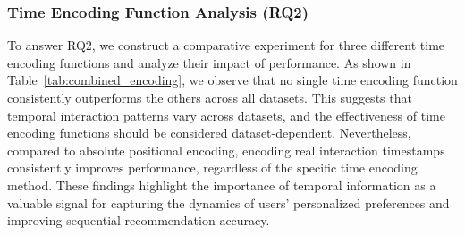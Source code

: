 \documentclass[sigconf,nonacm]{acmart}
\begin{document}
\subsubsection{Time Encoding Function Analysis (RQ2)}
\label{subsubsec:Encoding_Analysis}
To answer RQ2, we construct a comparative experiment for three different time encoding functions and analyze their impact of performance. As shown in Table~\ref{tab:combined_encoding}, we observe that no single time encoding function consistently outperforms the others across all datasets. This suggests that temporal interaction patterns vary across datasets, and the effectiveness of time encoding functions should be considered dataset-dependent. Nevertheless, compared to absolute positional encoding, encoding real interaction timestamps consistently improves performance, regardless of the specific time encoding method. These findings highlight the importance of temporal information as a valuable signal for capturing the dynamics of users' personalized preferences and improving sequential recommendation accuracy.
\end{document}
